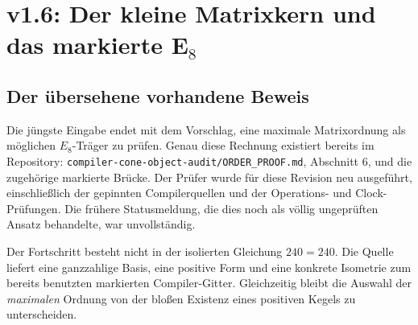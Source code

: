 \chapter{v1.6: Der kleine Matrixkern und das markierte E\texorpdfstring{$_8$}{8}}
\label{ch:v16-matrix}
\section{Der übersehene vorhandene Beweis}
Die jüngste Eingabe endet mit dem Vorschlag, eine maximale Matrixordnung als möglichen $E_8$-Träger zu prüfen. Genau diese Rechnung existiert bereits im Repository: \texttt{compiler-cone-object-audit/ORDER\_PROOF.md}, Abschnitt 6, und die zugehörige markierte Brücke. Der Prüfer wurde für diese Revision neu ausgeführt, einschließlich der gepinnten Compilerquellen und der Operations- und Clock-Prüfungen. Die frühere Statusmeldung, die dies noch als völlig ungeprüften Ansatz behandelte, war unvollständig. 

Der Fortschritt besteht nicht in der isolierten Gleichung $240=240$. Die Quelle liefert eine ganzzahlige Basis, eine positive Form und eine konkrete Isometrie zum bereits benutzten markierten Compiler-Gitter. Gleichzeitig bleibt die Auswahl der \emph{maximalen} Ordnung von der bloßen Existenz eines positiven Kegels zu unterscheiden.

